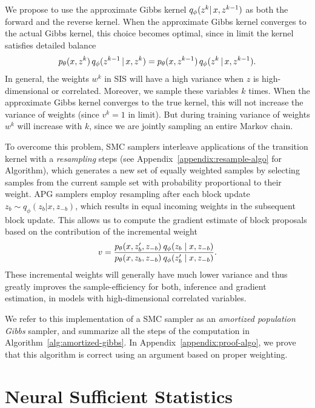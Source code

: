\documentclass{article}
\theoremstyle{definition}
\begin{document}
We propose to use the approximate Gibbs kernel $q_\phi(z^k |\, x, z^{k-1})$ as both the forward and the reverse kernel. When the approximate Gibbs kernel converges to the actual Gibbs kernel, this choice becomes optimal, since in limit the kernel satisfies detailed balance 
\begin{align*}
    p_\theta(x, z^k) 
    \,
    q_\phi(z^{k-1} \,|\, x, z^{k})
    =
    p_\theta(x, z^{k-1}) 
    \,
    q_\phi(z^{k} \,|\, x, z^{k-1}).
\end{align*}
In general, the weights $w^k$ in SIS will have a high variance when $z$ is high-dimensional or correlated. Moreover, we sample these variables $k$ times. When the approximate Gibbs kernel converges to the true kernel, this will not increase the variance of weights (since $v^k=1$ in limit). But during training variance of weights $w^k$ will increase with $k$, since we are jointly sampling an entire Markov chain.


To overcome this problem, SMC samplers interleave applications of the transition kernel with a \emph{resampling} steps (see Appendix~\ref{appendix:resample-algo} for Algorithm), which generates a new set of equally weighted samples by selecting samples from the current sample set with probability proportional to their weight.
APG samplers employ resampling after each block update $z_b \sim q_\phi(z_b | x, z_{-b})$, which results in equal incoming weights in the subsequent block update. This allows us to compute the gradient estimate of  block proposals based on the contribution of the incremental weight 
\begin{align*}
    v
    = 
    \frac{p_\theta(x, z'_b, z_{-b}) \: q_\phi(z_b \mid  x, z_{-b})}
         {p_\theta(x, z_b, z_{-b}) \: q_\phi(z'_b \mid  x, z_{-b})}
    .
\end{align*}
These incremental weights will generally have much lower variance and thus greatly improves the sample-efficiency for both, inference and gradient estimation, in models with high-dimensional correlated variables.

We refer to this implementation of a SMC sampler as an \emph{amortized population Gibbs} sampler, and summarize all the steps of the computation in Algorithm~\ref{alg:amortized-gibbs}. In Appendix~\ref{appendix:proof-algo}, we prove that this algorithm is correct using an argument based on proper weighting. 



\vspace{-0.75ex}
\section{Neural Sufficient Statistics}
\vspace{-0.5ex}
\end{document}
